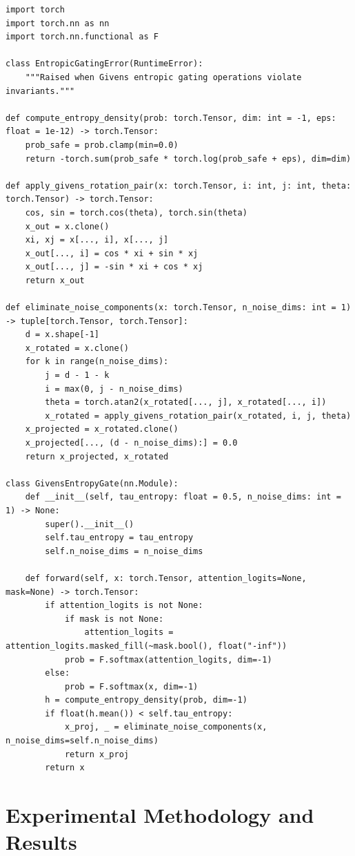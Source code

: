 \documentclass{article}
\newcommand{\qigea}{\textsc{QIG-EA}\xspace}
\begin{document}
\begin{lstlisting}[caption={PyTorch implementation of Quantum-Inspired Givens Entropic Attention (\qigea)},label={lst:entropic_gating}]
import torch
import torch.nn as nn
import torch.nn.functional as F

class EntropicGatingError(RuntimeError):
    """Raised when Givens entropic gating operations violate invariants."""

def compute_entropy_density(prob: torch.Tensor, dim: int = -1, eps: float = 1e-12) -> torch.Tensor:
    prob_safe = prob.clamp(min=0.0)
    return -torch.sum(prob_safe * torch.log(prob_safe + eps), dim=dim)

def apply_givens_rotation_pair(x: torch.Tensor, i: int, j: int, theta: torch.Tensor) -> torch.Tensor:
    cos, sin = torch.cos(theta), torch.sin(theta)
    x_out = x.clone()
    xi, xj = x[..., i], x[..., j]
    x_out[..., i] = cos * xi + sin * xj
    x_out[..., j] = -sin * xi + cos * xj
    return x_out

def eliminate_noise_components(x: torch.Tensor, n_noise_dims: int = 1) -> tuple[torch.Tensor, torch.Tensor]:
    d = x.shape[-1]
    x_rotated = x.clone()
    for k in range(n_noise_dims):
        j = d - 1 - k
        i = max(0, j - n_noise_dims)
        theta = torch.atan2(x_rotated[..., j], x_rotated[..., i])
        x_rotated = apply_givens_rotation_pair(x_rotated, i, j, theta)
    x_projected = x_rotated.clone()
    x_projected[..., (d - n_noise_dims):] = 0.0
    return x_projected, x_rotated

class GivensEntropyGate(nn.Module):
    def __init__(self, tau_entropy: float = 0.5, n_noise_dims: int = 1) -> None:
        super().__init__()
        self.tau_entropy = tau_entropy
        self.n_noise_dims = n_noise_dims

    def forward(self, x: torch.Tensor, attention_logits=None, mask=None) -> torch.Tensor:
        if attention_logits is not None:
            if mask is not None:
                attention_logits = attention_logits.masked_fill(~mask.bool(), float("-inf"))
            prob = F.softmax(attention_logits, dim=-1)
        else:
            prob = F.softmax(x, dim=-1)
        h = compute_entropy_density(prob, dim=-1)
        if float(h.mean()) < self.tau_entropy:
            x_proj, _ = eliminate_noise_components(x, n_noise_dims=self.n_noise_dims)
            return x_proj
        return x
\end{lstlisting}

\section{Experimental Methodology and Results}
\label{sec:experiments}
\end{document}
